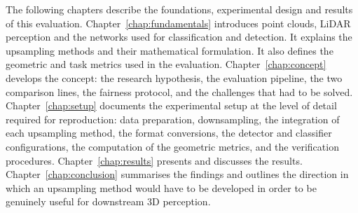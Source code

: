 The following chapters describe the foundations, experimental design and
results of this evaluation. Chapter~\ref{chap:fundamentals} introduces
point clouds, \ac{LiDAR} perception and the networks used for classification
and detection. It explains the upsampling methods and their mathematical
formulation. It also defines the geometric and task metrics used in the
evaluation.
Chapter~\ref{chap:concept} develops the concept: the research hypothesis,
the evaluation pipeline, the two comparison lines, the fairness protocol,
and the challenges that had to be solved. Chapter~\ref{chap:setup} documents
the experimental setup at the level of detail required for reproduction:
data preparation, downsampling, the integration of each upsampling method,
the format conversions, the detector and classifier configurations, the
computation of the geometric metrics, and the verification procedures.
Chapter~\ref{chap:results} presents and discusses the results.
Chapter~\ref{chap:conclusion} summarises the findings and outlines the
direction in which an upsampling method would have to be developed in order
to be genuinely useful for downstream 3D perception.
